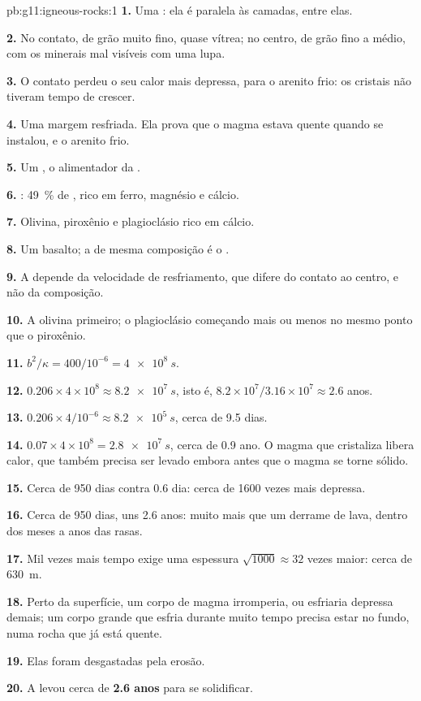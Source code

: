 \begin{solution}{pb:g11:igneous-rocks:1}
\textbf{1.} Uma : ela é paralela às camadas, entre elas.

\textbf{2.} No contato, de grão muito fino, quase vítrea; no centro, de grão
fino a médio, com os minerais mal visíveis com uma lupa.

\textbf{3.} O contato perdeu o seu calor mais depressa, para o arenito
frio: os cristais não tiveram tempo de crescer.

\textbf{4.} Uma margem resfriada. Ela prova que o magma estava quente quando
se instalou, e o arenito frio.

\textbf{5.} Um , o alimentador da .

\textbf{6.} : \qty{49}{\percent} de , rico em ferro, magnésio
e cálcio.

\textbf{7.} Olivina, piroxênio e plagioclásio rico em cálcio.

\textbf{8.} Um basalto; a  de mesma composição é o .

\textbf{9.} A  depende da velocidade de resfriamento, que difere do
contato ao centro, e não da composição.

\textbf{10.} A olivina primeiro; o plagioclásio começando mais ou menos no
mesmo ponto que o piroxênio.

\textbf{11.} $b^2/\kappa = 400/10^{-6} = \qty{4e8}{s}$.

\textbf{12.} $0.206 \times 4 \times 10^8 \approx \qty{8.2e7}{s}$, isto é,
$8.2 \times 10^7 / 3.16 \times 10^7 \approx 2.6$ anos.

\textbf{13.} $0.206 \times 4/10^{-6} \approx \qty{8.2e5}{s}$, cerca de 9.5
dias.

\textbf{14.} $0.07 \times 4 \times 10^8 = \qty{2.8e7}{s}$, cerca de 0.9 ano.
O magma que cristaliza libera calor, que também precisa ser levado embora
antes que o magma se torne sólido.

\textbf{15.} Cerca de 950 dias contra 0.6 dia: cerca de 1600 vezes mais depressa.

\textbf{16.} Cerca de 950 dias, uns 2.6 anos: muito mais que um derrame de
lava, dentro dos meses a anos das  rasas.

\textbf{17.} Mil vezes mais tempo exige uma espessura $\sqrt{1000} \approx
32$ vezes maior: cerca de \qty{630}{m}.

\textbf{18.} Perto da superfície, um corpo de magma irromperia, ou esfriaria
depressa demais; um corpo grande que esfria durante muito tempo precisa
estar no fundo, numa rocha que já está quente.

\textbf{19.} Elas foram desgastadas pela erosão.

\textbf{20.} A  levou cerca de \textbf{2.6 anos} para se solidificar.
\end{solution}
